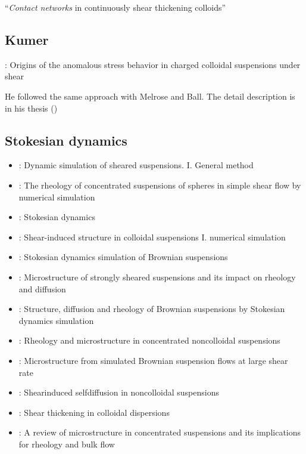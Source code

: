 \documentclass[12pt]{article}
\begin{document}
\citet{Melrose_2004}
``\emph{Contact networks} in continuously shear thickening colloids''


\subsection*{Kumer}

\citet{Kumar_2010}:
Origins of the anomalous stress behavior in charged colloidal suspensions under shear

He followed the same approach with Melrose and Ball.
The detail description is in his thesis (\citet{Kumar_2010a})


\subsection*{Stokesian dynamics}

\begin{itemize}
  \item 
  \citet{Bossis_1984}:
  Dynamic simulation of sheared suspensions. I. General method
  \item
  \citet{Brady_1985}:
  The rheology of concentrated suspensions of spheres in simple shear flow by numerical simulation
  \item 
  \citet{Brady_1988}:
  Stokesian dynamics
  \item
  \citet{Bossis_1988}:
  Shear-induced structure in colloidal suspensions I. numerical simulation

  \item \citet{Phung_1996}:
  Stokesian dynamics simulation of Brownian suspensions
  \item \citet{Brady_1997}: 
  Microstructure of strongly sheared suspensions and its impact on rheology and diffusion

  \item \citet{Foss_2000}:
  Structure, diffusion and rheology of {B}rownian suspensions by {S}tokesian dynamics simulation
  \item \citet{Sierou_2002}:
  Rheology and microstructure in concentrated noncolloidal suspensions
  \item \citet{Morris_2002}:
  Microstructure from simulated Brownian suspension flows at large shear rate
  \item \citet{Sierou_2004}:
  Shearinduced selfdiffusion in noncolloidal suspensions
  \item \citet{Wagner_2009}:
  Shear thickening in colloidal dispersions
  \item \citet{Morris_2009}:
  A review of microstructure in concentrated suspensions 
  and its implications for rheology and bulk flow
\end{itemize}
\end{document}
